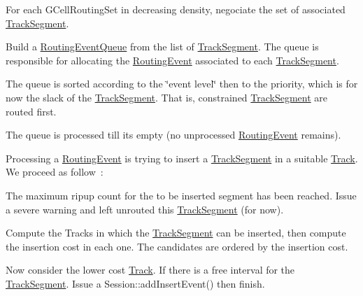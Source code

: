 For each {\ttfamily G\+Cell\+Routing\+Set} in decreasing density, negociate the set of associated {\ttfamily \mbox{\hyperlink{classKite_1_1TrackSegment}{Track\+Segment}}}. 
\begin{DoxyEnumerate}
\item Build a {\ttfamily \mbox{\hyperlink{classKite_1_1RoutingEventQueue}{Routing\+Event\+Queue}}} from the list of {\ttfamily \mbox{\hyperlink{classKite_1_1TrackSegment}{Track\+Segment}}}. The queue is responsible for allocating the {\ttfamily \mbox{\hyperlink{classKite_1_1RoutingEvent}{Routing\+Event}}} associated to each {\ttfamily \mbox{\hyperlink{classKite_1_1TrackSegment}{Track\+Segment}}}. 
\item The queue is sorted according to the \char`\"{}event level\char`\"{} then to the priority, which is for now the slack of the {\ttfamily \mbox{\hyperlink{classKite_1_1TrackSegment}{Track\+Segment}}}. That is, constrained {\ttfamily \mbox{\hyperlink{classKite_1_1TrackSegment}{Track\+Segment}}} are routed first. 
\item The queue is processed till it\textquotesingle{}s empty (no unprocessed {\ttfamily \mbox{\hyperlink{classKite_1_1RoutingEvent}{Routing\+Event}}} remains).

Processing a {\ttfamily \mbox{\hyperlink{classKite_1_1RoutingEvent}{Routing\+Event}}} is trying to insert a {\ttfamily \mbox{\hyperlink{classKite_1_1TrackSegment}{Track\+Segment}}} in a suitable \mbox{\hyperlink{classKite_1_1Track}{Track}}. We proceed as follow~\+: 
\begin{DoxyItemize}
\item The maximum ripup count for the to be inserted segment has been reached. Issue a severe warning and left unrouted this {\ttfamily \mbox{\hyperlink{classKite_1_1TrackSegment}{Track\+Segment}}} (for now). 
\item Compute the Tracks in which the {\ttfamily \mbox{\hyperlink{classKite_1_1TrackSegment}{Track\+Segment}}} can be inserted, then compute the insertion cost in each one. The candidates are ordered by the insertion cost. 
\item Now consider the lower cost {\ttfamily \mbox{\hyperlink{classKite_1_1Track}{Track}}}. If there is a free interval for the {\ttfamily \mbox{\hyperlink{classKite_1_1TrackSegment}{Track\+Segment}}}. Issue a {\ttfamily Session\+::add\+Insert\+Event()} then finish.


\end{DoxyItemize}
\end{DoxyEnumerate}
